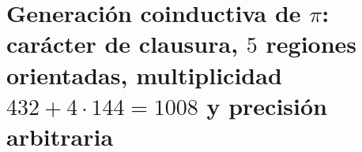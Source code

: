 \chapter{Generación coinductiva de \(\pi\): carácter de clausura, \(5\) regiones orientadas, multiplicidad \(432+4\cdot144=1008\) y precisión arbitraria}
\label{chap:p3-final:28:generacion_pi}


